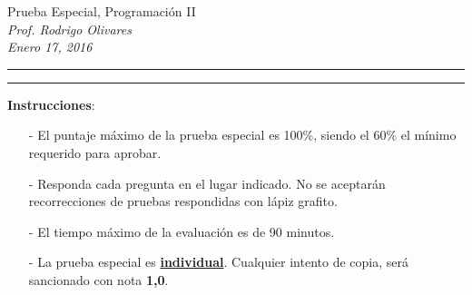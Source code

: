\documentclass[10pt]{article}
\begin{document}
\begin{center}
    {\Large Prueba Especial, Programaci\'on II} \\
    \emph{\small Prof. Rodrigo Olivares} \\
    \emph{\scriptsize Enero 17, 2016}
\end{center}
\vspace*{-35pt}
\begin{center}
    \rule{1\textwidth}{.3pt}
\end{center}
\vspace*{-42pt}
\begin{center}
    \rule{1\textwidth}{2pt}
\end{center}

\vspace*{-15pt}
\textbf{Instrucciones}:
\vspace*{-15pt}

\begin{itemize}
    \item[-] El puntaje m\'aximo de la prueba especial es 100\%, siendo el 60\% el m\'inimo requerido para aprobar.
	\item[-] Responda cada pregunta en el lugar indicado. No se aceptar\'an recorrecciones de pruebas respondidas con l\'apiz grafito.
	\item[-] El tiempo m\'aximo de la evaluaci\'on es de 90 minutos.
    \item[-] La prueba especial es \underline{\textbf{individual}}. Cualquier intento de copia, ser\'a sancionado con nota \textbf{1,0}.
\end{itemize}
\vspace*{-20pt}
\end{document}
